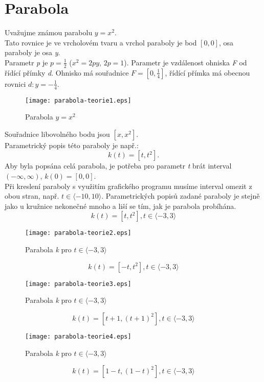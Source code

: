 		      \section{Parabola}
		      Uvažujme známou parabolu $y=x^2$.\\
		      Tato rovnice je ve vrcholovém tvaru a vrchol paraboly je bod $[0,0]$, osa paraboly je osa \textit{y}. \\
		      Parametr \textit{p} je $p=\frac{1}{2}$ ($x^2=2py$, $2p=1$).
		      Parametr je vzdálenost ohniska \textit{F} od řídící přímky \textit{d}. Ohnisko má souřadnice $F=\left[0, \frac{1}{4}\right]$, řídící přímka má obecnou rovnici $d: y=-\frac{1}{4}$.
		      \begin{figure}[H]
		      	\centering
		      	\texttt{[image: parabola-teorie1.eps]}
		      	\caption{Parabola $y=x^2$}
		      \end{figure}
		      \noindent Souřadnice libovolného bodu jsou $[x, x^2]$. \\
		      Parametrický popis této paraboly je např.:
		      $$k(t) = [t, t^2].$$
		      Aby byla popsána celá parabola, je potřeba pro parametr \textit{t} brát interval $(-\infty, \infty)$, $k(0)=[0,0]$. \\
		      Při kreslení paraboly s využitím grafického programu musíme interval omezit z obou stran, např. $t \in \langle-10, 10\rangle$.
		      \clearpage
		      Parametrických popisů zadané paraboly je stejně jako u kružnice nekonečné mnoho a liší se tím, jak je parabola probíhána.
		      $$k(t)=[t, t^2], t \in \langle-3,3\rangle$$
		      \begin{figure}[H]
		      	\centering
		      	\texttt{[image: parabola-teorie2.eps]}
		      	\caption{Parabola \textit{k} pro $t \in \langle-3,3\rangle$}
		      \end{figure}
		      $$k(t)=[-t, t^2], t \in \langle-3,3\rangle$$
		      \begin{figure}[H]
		      	\centering
		      	\texttt{[image: parabola-teorie3.eps]}
		      	\caption{Parabola \textit{k} pro $t \in \langle-3,3\rangle$}
		      \end{figure}
		      $$k(t)=[t+1, (t+1)^2], t \in \langle-3,3\rangle$$
		      \begin{figure}[H]
		      	\centering
		      	\texttt{[image: parabola-teorie4.eps]}
		      	\caption{Parabola \textit{k} pro $t \in \langle-3,3\rangle$}
		      \end{figure}
		      $$k(t)=[1-t, (1-t)^2], t \in \langle-3,3\rangle$$
